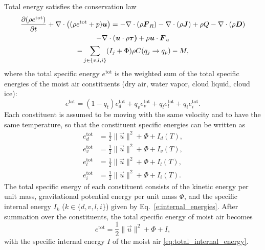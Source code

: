 \documentclass{article}
\begin{document}
Total energy satisfies the conservation law \citep{Romps08a,Bott08a} 
\begin{multline}
 \frac{\partial (\rho e^\mathrm{tot})}{\partial t} + \nabla \cdot \left( (\rho e^\mathrm{tot} + p)\boldsymbol{{u}} \right)
 = -\nabla \cdot (\rho \boldsymbol{{F}}_R) - \nabla \cdot (\rho \boldsymbol{{J}}) + \rho Q - \nabla \cdot (\rho \boldsymbol{{D}})  \\
  - \nabla \cdot (\boldsymbol{{u}} \cdot \rho\boldsymbol{{\tau)}} + \rho \boldsymbol{{u}} \cdot \boldsymbol{{F}}_u \\
   - \sum_{j\in\{v,l,i\}}(I_j + \Phi)  \rho C(q_j \rightarrow q_p) - M,
 \label{eq:energy_balance}
\end{multline}
where the total specific energy $e^{\mathrm{tot}}$ is the weighted sum of the total specific energies of the moist air constituents (dry air, water vapor, cloud liquid, cloud ice):
\begin{equation}\label{e:energy_sum}
    e^{\mathrm{tot}} = (1-q_t) e_d^{\mathrm{tot}} + q_v e_v^{\mathrm{tot}} + q_l e_l^{\mathrm{tot}} + q_i e_i^{\mathrm{tot}}.
\end{equation}
Each constituent is assumed to be moving with the same velocity and to have the same temperature, so that the constituent specific energies can be written as
\begin{subequations}\label{e:constituent_energies}
\begin{align}
e_d^{\mathrm{tot}} & = \frac{1}{2} \| \vec{u} \|^2 + \Phi + I_d(T), \\
e_v^{\mathrm{tot}} & = \frac{1}{2} \| \vec{u} \|^2 + \Phi + I_v(T), \\
e_l^{\mathrm{tot}} & = \frac{1}{2} \| \vec{u} \|^2 + \Phi + I_l(T), \\
e_i^{\mathrm{tot}} & = \frac{1}{2} \| \vec{u} \|^2 + \Phi + I_i(T).
\end{align}
\end{subequations}
The total specific energy of each constituent consists of the kinetic energy per unit mass, gravitational potential energy per unit mass $\Phi$, and the specific internal energy $I_k$ ($k \in \{d, v, l, i\}$) given by Eq.~\eqref{e:internal_energies}. After summation over the constituents, the total specific energy of moist air becomes
\begin{equation}
     e^{\mathrm{tot}} = \frac{1}{2} \| \vec{u} \|^2 + \Phi + I,
     \label{eq:total_energy_def}
\end{equation}
with the specific internal energy $I$ of the moist air \eqref{eq:total_internal_energy}.
\end{document}
